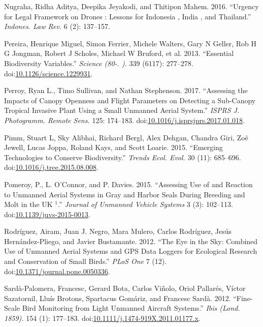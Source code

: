 \documentclass[]{interact}
\theoremstyle{plain}%
\theoremstyle{definition}
\theoremstyle{remark}
\begin{document}
\hypertarget{ref-nugraha_urgency_2016}{}
Nugraha, Ridha Aditya, Deepika Jeyakodi, and Thitipon Mahem. 2016.
``Urgency for Legal Framework on Drones : Lessons for Indonesia , India
, and Thailand.'' \emph{Indones. Law Rev.} 6 (2): 137--157.

\hypertarget{ref-pereira_essential_2013}{}
Pereira, Henrique Miguel, Simon Ferrier, Michele Walters, Gary N Geller,
Rob H G Jongman, Robert J Scholes, Michael W Bruford, et al. 2013.
``Essential Biodiversity Variables.'' \emph{Science (80-. ).} 339
(6117): 277--278.
doi:\href{https://doi.org/10.1126/science.1229931}{10.1126/science.1229931}.

\hypertarget{ref-perroy_assessing_2017}{}
Perroy, Ryan L., Timo Sullivan, and Nathan Stephenson. 2017. ``Assessing
the Impacts of Canopy Openness and Flight Parameters on Detecting a
Sub-Canopy Tropical Invasive Plant Using a Small Unmanned Aerial
System.'' \emph{ISPRS J. Photogramm. Remote Sens.} 125: 174--183.
doi:\href{https://doi.org/10.1016/j.isprsjprs.2017.01.018}{10.1016/j.isprsjprs.2017.01.018}.

\hypertarget{ref-pimm_emerging_2015}{}
Pimm, Stuart L, Sky Alibhai, Richard Bergl, Alex Dehgan, Chandra Giri,
Zoë Jewell, Lucas Joppa, Roland Kays, and Scott Loarie. 2015. ``Emerging
Technologies to Conserve Biodiversity.'' \emph{Trends Ecol. Evol.} 30
(11): 685--696.
doi:\href{https://doi.org/10.1016/j.tree.2015.08.008}{10.1016/j.tree.2015.08.008}.

\hypertarget{ref-pomeroy_assessing_2015}{}
Pomeroy, P., L. O'Connor, and P. Davies. 2015. ``Assessing Use of and
Reaction to Unmanned Aerial Systems in Gray and Harbor Seals During
Breeding and Molt in the UK \(^{\textrm{1}}\).'' \emph{Journal of
Unmanned Vehicle Systems} 3 (3): 102--113.
doi:\href{https://doi.org/10.1139/juvs-2015-0013}{10.1139/juvs-2015-0013}.

\hypertarget{ref-rodriguez_eye_2012}{}
Rodríguez, Airam, Juan J. Negro, Mara Mulero, Carlos Rodríguez, Jesús
Hernández-Pliego, and Javier Bustamante. 2012. ``The Eye in the Sky:
Combined Use of Unmanned Aerial Systems and GPS Data Loggers for
Ecological Research and Conservation of Small Birds.'' \emph{PLoS One} 7
(12).
doi:\href{https://doi.org/10.1371/journal.pone.0050336}{10.1371/journal.pone.0050336}.

\hypertarget{ref-sarda-palomera_fine-scale_2012}{}
Sardà-Palomera, Francesc, Gerard Bota, Carlos Viñolo, Oriol Pallarés,
Víctor Sazatornil, Lluís Brotons, Spartacus Gomáriz, and Francesc Sardà.
2012. ``Fine-Scale Bird Monitoring from Light Unmanned Aircraft
Systems.'' \emph{Ibis (Lond. 1859).} 154 (1): 177--183.
doi:\href{https://doi.org/10.1111/j.1474-919X.2011.01177.x}{10.1111/j.1474-919X.2011.01177.x}.
\end{document}

